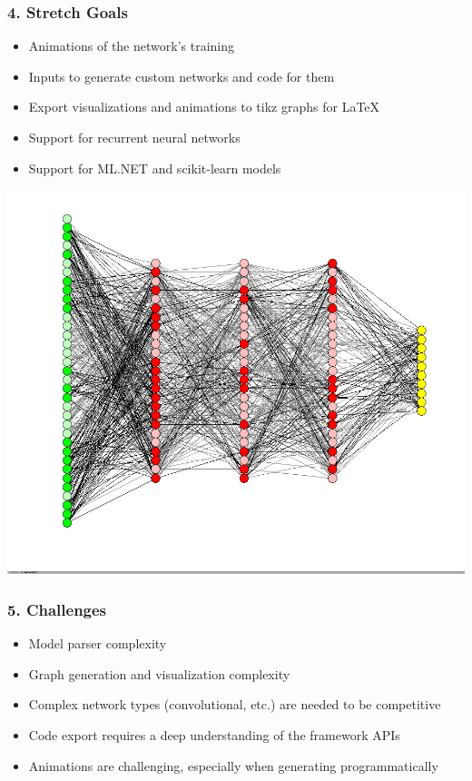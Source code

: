 \documentclass{beamer}
\begin{document}
\begin{frame}
    \frametitle{4. Stretch Goals} 
    \begin{itemize}
        \item Animations of the network's training
        \item Inputs to generate custom networks and code for them
        \item Export visualizations and animations to tikz graphs for \LaTeX 
        \item Support for recurrent neural networks
        \item Support for ML.NET and scikit-learn models
    \end{itemize}
    \centering
    \includegraphics[scale=.20]{large_NN.png}
\end{frame}

\begin{frame}
    \frametitle{5. Challenges}
    \begin{itemize}
        \item Model parser complexity
        \item Graph generation and visualization complexity
        \item Complex network types (convolutional, etc.) are needed to be competitive
        \item Code export requires a deep understanding of the framework APIs
        \item Animations are challenging, especially when generating programmatically
    \end{itemize}
\end{frame}
\end{document}
